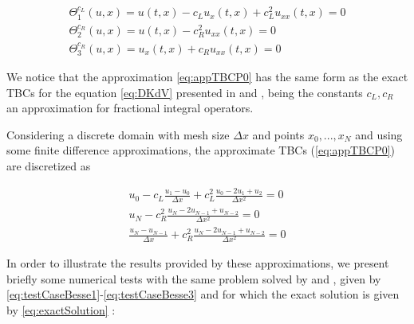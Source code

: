
\begin{equation}
  \label{eq:appTBCP0}
    \begin{gathered}
        \Theta_1^{c_L}(u,x) = u(t,x) - c_L u_x(t,x)  + c_L^2  u_{xx}(t,x) = 0 \\
        \Theta_2^{c_R}(u,x) =  u(t,x) - c_R^2    u_{xx}(t,x) = 0\\
        \Theta_3^{c_R} (u,x)= u_x(t,x) + c_R u_{xx}(t,x)  = 0
    \end{gathered}
\end{equation}

\indent We notice that the approximation \eqref{eq:appTBCP0} has the same form as the exact TBCs for the equation \eqref{eq:DKdV} presented in \cite{zheng2008} and \cite{besse2015}, being the constants $c_L,c_R$ an approximation for fractional integral operators. 

\indent Considering a discrete domain with mesh size $\Delta x$ and points $x_0, ..., x_N$ and using some finite difference approximations, the approximate TBCs (\ref{eq:appTBCP0}) are discretized as

\begin{equation}
\label{eq:appDiscTBCP0}
    \begin{gathered}
        u_0 - c_L \frac{u_1 - u_0}{\Delta x}  + c_L^2  \frac{u_0 -2u_1 + u_2}{\Delta x^2} = 0 \\
        u_N - c_R^2    \frac{u_N -2u_{N-1} + u_{N-2}}{\Delta x^2} = 0 \\
        \frac{u_N - u_{N-1}}{\Delta x}  + c_R^2    \frac{u_N -2u_{N-1} + u_{N-2}}{\Delta x^2} = 0 
    \end{gathered}
\end{equation}

\indent In order to illustrate the results provided by these approximations, we present briefly some numerical tests with the same problem solved by \cite{zheng2008} and \cite{besse2015}, given by \eqref{eq:testCaseBesse1}-\eqref{eq:testCaseBesse3} and for which the exact solution is given by \eqref{eq:exactSolution} :

